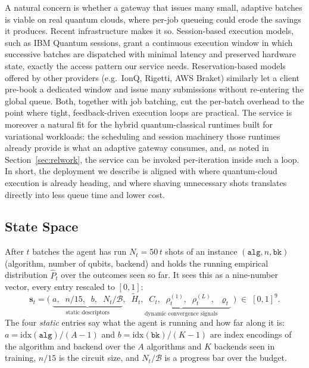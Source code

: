 \documentclass[runningheads]{llncs}
\begin{document}
A natural concern is whether a gateway that issues many small, adaptive batches
is viable on real quantum clouds, where per-job queueing could erode the savings
it produces. Recent infrastructure makes it so. Session-based execution models,
such as IBM Quantum sessions, grant a continuous execution window in which
successive batches are dispatched with minimal latency and preserved hardware
state, exactly the access pattern our service needs. Reservation-based models
offered by other providers (e.g.\ IonQ, Rigetti, AWS Braket) similarly let a
client pre-book a dedicated window and issue many submissions without re-entering
the global queue. Both, together with job batching, cut the per-batch overhead to
the point where tight, feedback-driven execution loops are practical. The service
is moreover a natural fit for the hybrid quantum-classical runtimes built for
variational workloads: the scheduling and session machinery those runtimes
already provide is what an adaptive gateway consumes, and, as noted in
Section~\ref{sec:relwork}, the service can be invoked per-iteration inside such a
loop. In short, the deployment we describe is aligned with where quantum-cloud
execution is already heading, and where shaving unnecessary shots translates
directly into less queue time and lower cost.

\subsection{State Space}
\label{sec:state}

After $t$ batches the agent has run $N_t = 50\,t$ shots of an instance
$(\mathtt{alg},n,\mathtt{bk})$ (algorithm, number of qubits, backend) and holds
the running empirical distribution $\hat{P}_t$ over the outcomes seen so far. It
sees this as a nine-number vector, every entry rescaled to $[0,1]$:
\begin{equation}
\mathbf{s}_t = \bigl(\;
  \underbrace{a,\;\; n/15,\;\; b,\;\; N_t/\mathcal{B}}_{\text{static descriptors}},\;\;
  \underbrace{\tilde{H}_t,\;\; C_t,\;\; \rho^{(1)}_t,\;\; \rho^{(L)}_t,\;\; \varrho_t}_{\text{dynamic convergence signals}}
\;\bigr)\;\in\;[0,1]^{9}.
\label{eq:state}
\end{equation}
The four \emph{static} entries say what the agent is running and how far along it
is: $a=\mathrm{idx}(\mathtt{alg})/(A-1)$ and $b=\mathrm{idx}(\mathtt{bk})/(K-1)$
are index encodings of the algorithm and backend over the $A$ algorithms and $K$
backends seen in training, $n/15$ is the circuit size, and $N_t/\mathcal{B}$ is a
progress bar over the budget.
\end{document}
